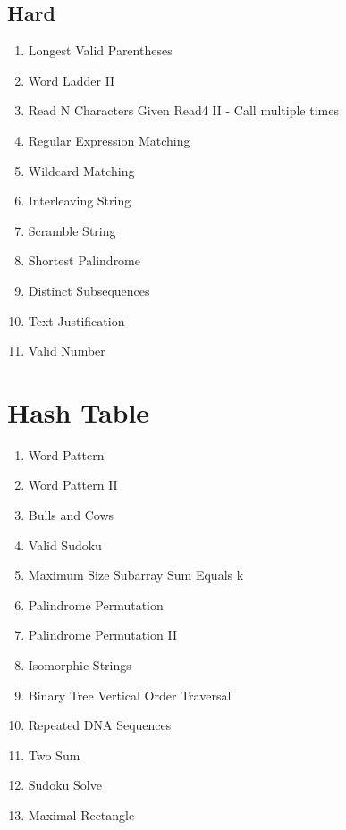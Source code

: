 \documentclass[DIV=calc, paper=a4, fontsize=11pt, twocolumn]{scrartcl}	 %
\begin{document}
\subsection*{Hard}
\begin{enumerate}
\item Longest Valid Parentheses \cite{032}
\item Word Ladder II  \cite{126}
\item Read N Characters Given Read4 II - Call multiple times \cite{158}
\item Regular Expression Matching  \cite{010}
\item Wildcard Matching  \cite{044}
\item Interleaving String  \cite{097}
\item Scramble String  \cite{087}
\item Shortest Palindrome  \cite{214}
\item Distinct Subsequences  \cite{115}
\item Text Justification \cite{068}
\item Valid Number   \cite{065}
\end{enumerate}


\section*{Hash Table}

\begin{enumerate}
\item Word Pattern \cite{290} 
\item Word Pattern II \cite{291} 
\item Bulls and Cows \cite{299}
\item Valid Sudoku \cite{036}
\item Maximum Size Subarray Sum Equals k \cite{325}
\item Palindrome Permutation \cite{266}
\item Palindrome Permutation II \cite{267}
\item Isomorphic Strings \cite{205}
\item Binary Tree Vertical Order Traversal \cite{314} 
\item Repeated DNA Sequences \cite{187}
\item Two Sum \cite{001}
\item Sudoku Solve \cite{037}
\item Maximal Rectangle \cite{085}
\end{enumerate}


{}

\end{document}

